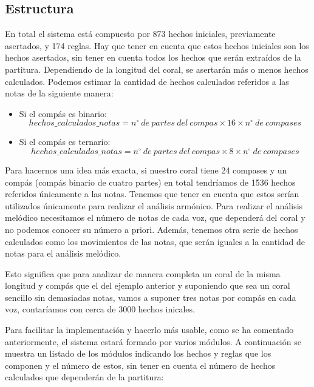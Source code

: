 \bigskip

\subsection{Estructura}

En total el sistema está compuesto por 873 hechos iniciales, previamente asertados, y 174 reglas. Hay que tener en cuenta que estos hechos iniciales son los hechos asertados, sin tener en cuenta todos los hechos que serán extraídos de la partitura. Dependiendo de la longitud del coral, se asertarán más o menos hechos calculados. Podemos estimar la cantidad de hechos calculados referidos a las notas de la siguiente manera:

\begin{itemize}

	\item Si el compás es binario:
		$$hechos\_calculados\_notas = n^{\circ}\ de\ partes\ del\ compas \times 16 \times n^{\circ}\ de\ compases$$

	\item Si el compás es ternario:
		$$hechos\_calculados\_notas = n^{\circ}\ de\ partes\ del\ compas \times 8 \times n^{\circ}\ de\ compases$$

\end{itemize}

\bigskip

Para hacernos una idea más exacta, si nuestro coral tiene 24 compases y un compás  (compás binario de cuatro partes) en total tendríamos de 1536 hechos referidos únicamente a las notas. Tenemos que tener en cuenta que estos serían utilizados únicamente para realizar el análisis armónico. Para realizar el análisis melódico necesitamos el número de notas de cada voz, que dependerá del coral y no podemos conocer su número a priori. Además, tenemos otra serie de hechos calculados como los movimientos de las notas, que serán iguales a la cantidad de notas para el análisis melódico.

Esto significa que para analizar de manera completa un coral de la misma longitud y compás que el del ejemplo anterior y suponiendo que sea un coral sencillo sin demasiadas notas, vamos a suponer tres notas por compás en cada voz, contaríamos con cerca de 3000 hechos inicales.

Para facilitar la implementación y hacerlo más usable, como se ha comentado anteriormente, el sistema estará formado por varios módulos. A continuación se muestra un listado de los módulos indicando los hechos y reglas que los componen y el número de estos, sin tener en cuenta el número de hechos calculados que dependerán de la partitura:

